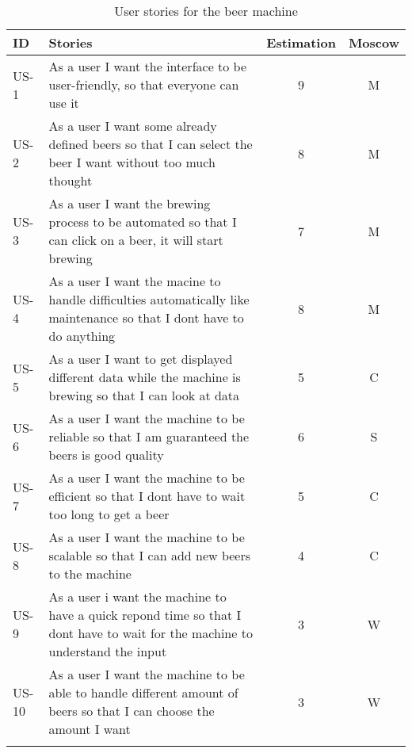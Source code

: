 \begin{table}[H]
    \begin{center}
        \sloppy
        \begin{longtable}{|p{1cm}|p{11cm}|c|c|}
            \hline
            ID & Stories & Estimation & Moscow \\ \hline
            US-1 & As a user I want the interface to be user-friendly, so that everyone can use it & 9 & M \\ \hline
            US-2 & As a user I want some already defined beers  so that I can select the beer I want without too much thought & 8 & M \\ \hline
            US-3 & As a user I want the brewing process to be automated so that I can click on a beer, it will start brewing & 7 & M \\ \hline
            US-4 & As a user I want the macine to handle difficulties automatically like maintenance so that I dont have to do anything & 8 & M \\ \hline
            US-5 & As a user I want to get displayed different data while the machine is brewing so that I can look at data & 5 & C \\ \hline
            US-6 & As a user I want the machine to be reliable so that I am guaranteed the beers is good quality & 6 & S \\ \hline
            US-7 & As a user I want the machine to be efficient so that I dont have to wait too long to get a beer & 5 & C \\ \hline
            US-8 & As a user I want the machine to be scalable so that I can add new beers to the machine & 4 & C \\ \hline
            US-9 & As a user i want the machine to have a quick repond time so that I dont have to wait for the machine to understand the input & 3 & W \\ \hline
            US-10 & As a user I want the machine to be able to handle different amount of beers so that I can choose the amount I want & 3 & W \\ \hline

            \caption{User stories for the beer machine}
            \label{tab:user_stories}
        \end{longtable}
    \end{center}
\end{table}

